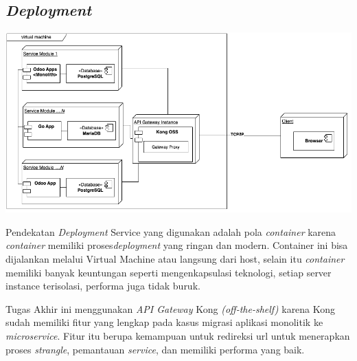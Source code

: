 \subsection{\textit{Deployment}}
\begin{center}
	\includegraphics[width=14cm]{img/bab_3/Deployment.png}
	\label{fig:asd}
\end{center}
Pendekatan \textit{Deployment} Service yang digunakan adalah pola \textit{container} karena \textit{container} memiliki proses\textit{deployment} yang ringan dan modern. Container ini bisa dijalankan melalui Virtual Machine atau langsung dari host, selain itu \textit{container} memiliki banyak keuntungan seperti mengenkapsulasi teknologi, setiap server instance terisolasi, performa juga tidak buruk.  

Tugas Akhir ini menggunakan \textit{API Gateway} Kong \textit{(off-the-shelf)} karena Kong sudah memiliki fitur yang lengkap pada kasus migrasi aplikasi monolitik ke \textit{microservice}. Fitur itu berupa kemampuan untuk redireksi url untuk menerapkan proses \textit{strangle}, pemantauan \textit{service}, dan memiliki performa yang baik.
